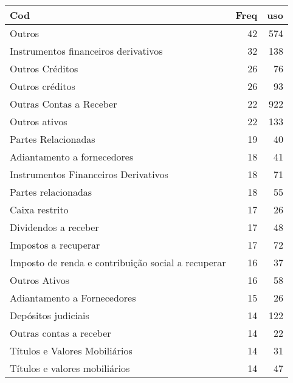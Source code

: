 \begin{table}[ht]
\centering
\begin{tabular}{lrr}
  \hline
Cod & Freq & uso \\ 
  \hline
Outros &  42 & 574 \\ 
  Instrumentos financeiros derivativos &  32 & 138 \\ 
  Outros Créditos &  26 &  76 \\ 
  Outros créditos &  26 &  93 \\ 
  Outras Contas a Receber &  22 & 922 \\ 
  Outros ativos &  22 & 133 \\ 
  Partes Relacionadas &  19 &  40 \\ 
  Adiantamento a fornecedores &  18 &  41 \\ 
  Instrumentos Financeiros Derivativos &  18 &  71 \\ 
  Partes relacionadas &  18 &  55 \\ 
  Caixa restrito &  17 &  26 \\ 
  Dividendos a receber &  17 &  48 \\ 
  Impostos a recuperar &  17 &  72 \\ 
  Imposto de renda e contribuição social a recuperar &  16 &  37 \\ 
  Outros Ativos &  16 &  58 \\ 
  Adiantamento a Fornecedores &  15 &  26 \\ 
  Depósitos judiciais &  14 & 122 \\ 
  Outras contas a receber &  14 &  22 \\ 
  Títulos e Valores Mobiliários &  14 &  31 \\ 
  Títulos e valores mobiliários &  14 &  47 \\ 
   \hline
\end{tabular}
\end{table}
